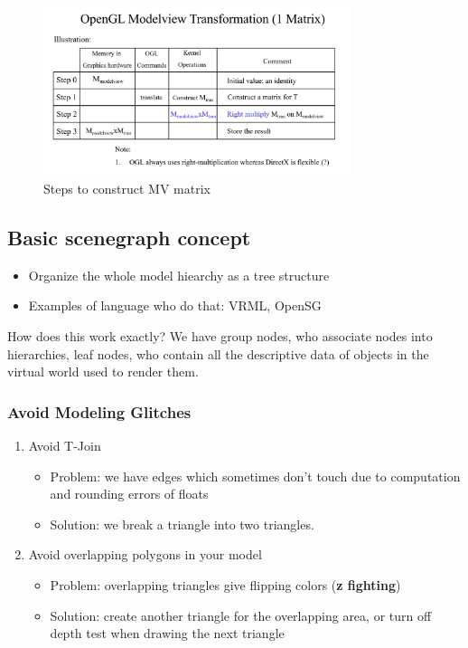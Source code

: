 \documentclass[11pt]{article}
\begin{document}
\begin{figure}[h]
    \centering
    \includegraphics[width=0.8\textwidth]{mv_steps.png}
    \caption{Steps to construct MV matrix}
    \label{fig:mv_steps}
\end{figure}
 
\subsection{Basic scenegraph concept}
\begin{itemize}
    \item Organize the whole model hiearchy as a tree structure
    \item Examples of language who do that: VRML, OpenSG
\end{itemize}

How does this work exactly? We have group nodes, who associate nodes into hierarchies, leaf nodes, who contain all the descriptive data of objects in the virtual world used to render them.

\subsubsection*{Avoid Modeling Glitches}
\begin{enumerate}
    \item Avoid T-Join \begin{itemize}
        \item Problem: we have edges which sometimes don't touch due to computation and rounding errors of floats
        \item Solution: we break a triangle into two triangles.
    \end{itemize}
    \item Avoid overlapping polygons in your model \begin{itemize}
        \item Problem: overlapping triangles give flipping colors (\textbf{z fighting})
        \item Solution: create another triangle for the overlapping area, or turn off depth test when drawing the next triangle
    \end{itemize}
    
    
\end{enumerate}
 
\end{document}
